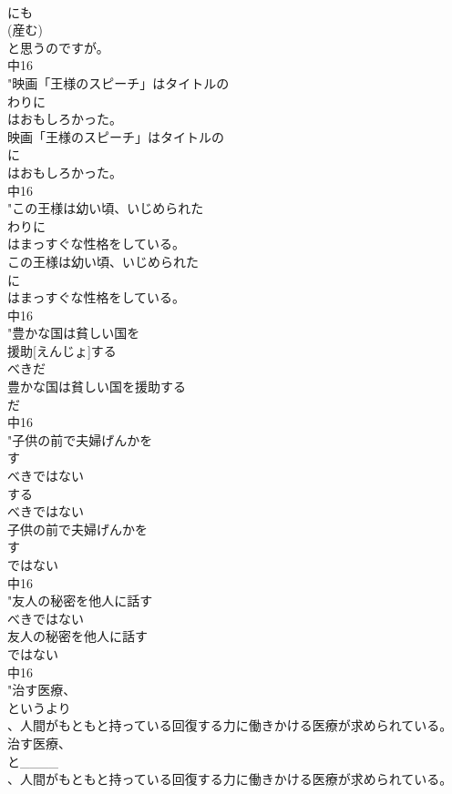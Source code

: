 \documentclass[8pt]{extreport}
\begin{document}
\begin{CJK}{UTF8}{min}
\\	にも
\\	(産む)
\\	と思うのですが。
\\	中16
\\	"映画「王様のスピーチ」はタイトルの
\\	わりに
\\	はおもしろかった。
\\	映画「王様のスピーチ」はタイトルの
\\	に
\\	はおもしろかった。
\\	中16
\\	"この王様は幼い頃、いじめられた
\\	わりに
\\	はまっすぐな性格をしている。
\\	この王様は幼い頃、いじめられた
\\	に
\\	はまっすぐな性格をしている。
\\	中16
\\	"豊かな国は貧しい国を
\\	援助[えんじょ]する
\\	べきだ
\\	豊かな国は貧しい国を援助する
\\	だ
\\	中16
\\	"子供の前で夫婦げんかを
\\	す
\\	べきではない
\\	する
\\	べきではない
\\	子供の前で夫婦げんかを
\\	す
\\	ではない
\\	中16
\\	"友人の秘密を他人に話す
\\	べきではない
\\	友人の秘密を他人に話す
\\	ではない
\\	中16
\\	"治す医療、
\\	というより
\\	、人間がもともと持っている回復する力に働きかける医療が求められている。
\\	治す医療、
\\	と____
\\	、人間がもともと持っている回復する力に働きかける医療が求められている。

\end{CJK}
\end{document}

